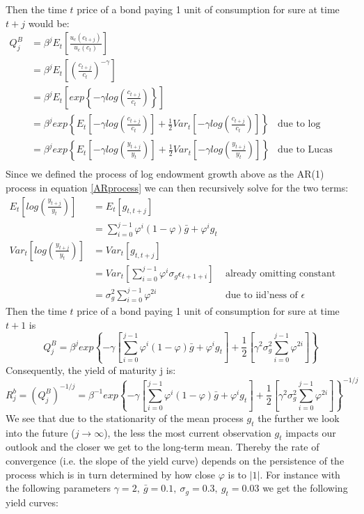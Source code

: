 \documentclass[12pt,letter]{article}
\begin{document}
Then the time $t$ price of a bond paying 1 unit of consumption for sure at time $t+j$ would be:
\begin{align*}
Q^B_j 	&= \beta^j E_t\left[\frac{u_c(c_{t+j})}{u_c(c_t)}\right]\\
		&= \beta^j E_t\left[\left(\frac{c_{t+j}}{c_t}\right)^{-\gamma}\right]\\
		&= \beta^j E_t\left[exp\left\lbrace - \gamma log\left(\frac{c_{t+j}}{c_t}\right)\right\rbrace\right] \\
		&= \beta^j exp\left\lbrace E_t\left[- \gamma log\left(\frac{c_{t+j}}{c_t}\right)\right] + \frac{1}{2}Var_t\left[- \gamma log\left(\frac{c_{t+j}}{c_t}\right)\right]\right\rbrace &\text{due to log normality}\\
		&= \beta^j exp\left\lbrace E_t\left[- \gamma log\left(\frac{y_{t+j}}{y_t}\right)\right] + \frac{1}{2}Var_t\left[- \gamma log\left(\frac{y_{t+j}}{y_t}\right)\right]\right\rbrace &\text{due to Lucas (1978) resource constraint}\\
\end{align*}
Since we defined the process of log endowment growth above as the AR(1) process in equation \ref{ARprocess} we can then recursively solve for the two terms:
\begin{align*}
E_t\left[log\left(\frac{y_{t+j}}{y_t}\right)\right] 	&= E_t\left[g_{t,t+j}\right]\\
														&= \sum_{i=0}^{j-1}\varphi^i (1-\varphi)\bar{g} + \varphi^i g_t\\
Var_t\left[log\left(\frac{y_{t+j}}{y_t}\right)\right]	&= Var_t\left[g_{t,t+j}\right]\\
														&= Var_t\left[\sum_{i=0}^{j-1}\varphi^i \sigma_g \epsilon_{t+1+i}\right] &\text{already omitting constant terms}\\
														&= \sigma^2_g \sum_{i=0}^{j-1}\varphi^{2i} &\text{due to iid'ness of $\epsilon$}
\end{align*}
Then the time $t$ price of a bond paying 1 unit of consumption for sure at time $t+1$ is
\begin{equation}
Q^B_j = \beta^j exp\left\lbrace - \gamma \left[ \sum_{i=0}^{j-1}\varphi^i (1-\varphi)\bar{g} + \varphi^i g_t \right]+ \frac{1}{2}\left[\gamma^2 \sigma^2_g \sum_{i=0}^{j-1}\varphi^{2i}\right]\right\rbrace
\end{equation}
Consequently, the yield of maturity j is:
\begin{equation}
R^b_j = (Q^B_j)^{-1/j} = \beta^{-1} exp\left\lbrace - \gamma \left[ \sum_{i=0}^{j-1}\varphi^i (1-\varphi)\bar{g} + \varphi^i g_t \right]+ \frac{1}{2}\left[\gamma^2 \sigma^2_g \sum_{i=0}^{j-1}\varphi^{2i}\right]\right\rbrace^{-1/j}
\end{equation}
We see that due to the stationarity of the mean process $g_t$ the further we look into the future ($j \to \infty$), the less the most current observation $g_t$ impacts our outlook and the closer we get to the long-term mean. Thereby the rate of convergence (i.e. the slope of the yield curve) depends on the persistence of the process which is in turn determined by how close $\varphi$ is to $|1|$.
For instance with the following parameters $\gamma = 2,\ \bar{g}= 0.1,\ \sigma_g = 0.3,\ g_t = 0.03$ we get the following yield curves:
\end{document}
